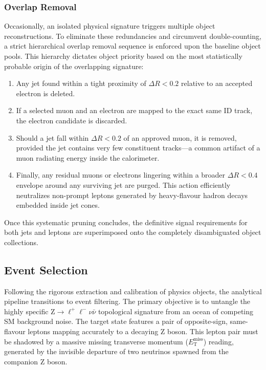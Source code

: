 \subsubsection{Overlap Removal}
Occasionally, an isolated physical signature triggers multiple object reconstructions. To eliminate these redundancies and circumvent double-counting, a strict hierarchical overlap removal sequence is enforced upon the baseline object pools. This hierarchy dictates object priority based on the most statistically probable origin of the overlapping signature:
\begin{enumerate}
    \item Any jet found within a tight proximity of $\Delta R < 0.2$ relative to an accepted electron is deleted.
    \item If a selected muon and an electron are mapped to the exact same ID track, the electron candidate is discarded.
    \item Should a jet fall within $\Delta R < 0.2$ of an approved muon, it is removed, provided the jet contains very few constituent tracks—a common artifact of a muon radiating energy inside the calorimeter.
    \item Finally, any residual muons or electrons lingering within a broader $\Delta R < 0.4$ envelope around any surviving jet are purged. This action efficiently neutralizes non-prompt leptons generated by heavy-flavour hadron decays embedded inside jet cones.
\end{enumerate}
Once this systematic pruning concludes, the definitive signal requirements for both jets and leptons are superimposed onto the completely disambiguated object collections.

\subsection{Event Selection}
\label{sec:llvv_event_selection}

Following the rigorous extraction and calibration of physics objects, the analytical pipeline transitions to event filtering. The primary objective is to untangle the highly specific $\text{Z} \to \ell^+\ell^- \nu\bar{\nu}$ topological signature from an ocean of competing SM background noise. The target state features a pair of opposite-sign, same-flavour leptons mapping accurately to a decaying $\text{Z}$ boson. This lepton pair must be shadowed by a massive missing transverse momentum ($E_{\text{T}}^{\text{miss}}$) reading, generated by the invisible departure of two neutrinos spawned from the companion $\text{Z}$ boson.

